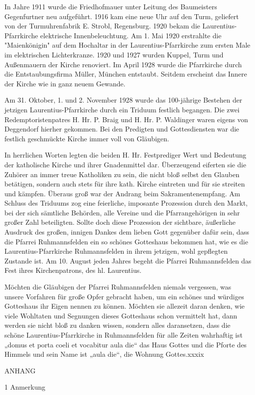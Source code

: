 \documentclass{book}
\begin{document}
In Jahre 1911 wurde die Friedhofmauer unter Leitung des Baumeisters Gegenfurtner
neu aufgeführt. 1916 kam eine neue Uhr auf den Turm, geliefert von der
Turmuhrenfabrik E. Strobl, Regensburg. 1920 bekam die Laurentius-Pfarrkirche
elektrische Innenbeleuchtung. Am 1. Mai 1920 erstrahlte die "Maienkönigin" auf
dem Hochaltar in der Laurentius-Pfarrkirche zum ersten Male im elektrischen
Lichterkranze. 1920 und 1927 wurden Kuppel, Turm und Außenmauern der Kirche
renoviert. Im April 1928 wurde die Pfarrkirche durch die Entstaubungsfirma
Müller, München entstaubt. Seitdem erscheint das Innere der Kirche wie in ganz
neuem Gewande.

Am 31. Oktober, 1. und 2. November 1928 wurde das 100-jährige Bestehen der
jetzigen Laurentius-Pfarrkirche durch ein Triduum festlich begangen. Die zwei
Redemptoristenpatres H. Hr. P. Braig und H. Hr. P. Waldinger waren eigens von
Deggendorf hierher gekommen. Bei den Predigten und Gottesdiensten war die
festlich geschmückte Kirche immer voll von Gläubigen.

In herrlichen Worten legten die beiden H. Hr. Festprediger Wert und Bedeutung
der katholische Kirche und ihrer Gnadenmittel dar. Überzeugend eiferten sie die
Zuhörer an immer treue Katholiken zu sein, die nicht bloß selbst den Glauben
betätigen, sondern auch stets für ihre kath. Kirche eintreten und für sie
streiten und kämpfen. Überaus groß war der Andrang beim Sakramentenempfang. Am
Schluss des Triduums zog eine feierliche, imposante Prozession durch den Markt,
bei der sich sämtliche Behörden, alle Vereine und die Pfarrangehörigen in sehr
großer Zahl beteiligten. Sollte doch diese Prozession der sichtbare, äußerliche
Ausdruck des großen, innigen Dankes dem lieben Gott gegenüber dafür sein, dass
die Pfarrei Ruhmannsfelden ein so schönes Gotteshaus bekommen hat, wie es die
Laurentius-Pfarrkirche Ruhmannsfelden in ihrem jetzigen, wohl gepflegten
Zustande ist. Am 10. August jeden Jahres begeht die Pfarrei Ruhmannsfelden das
Fest ihres Kirchenpatrons, des hl. Laurentius.

Möchten die Gläubigen der Pfarrei Ruhmannsfelden niemals vergessen, was unsere
Vorfahren für große Opfer gebracht haben, um ein schönes und würdiges Gotteshaus
ihr Eigen nennen zu können. Möchten sie allezeit daran denken, wie viele
Wohltaten und Segnungen dieses Gotteshaus schon vermittelt hat, dann werden sie
nicht bloß zu danken wissen, sondern alles daransetzen, dass die schöne
Laurentius-Pfarrkirche in Ruhmannsfelden für alle Zeiten wahrhaftig ist „domus
et porta coeli et vocabitur aula die“ das Haus Gottes und die Pforte des Himmels
und sein Name ist „aula die“, die Wohnung Gottes.xxxix



ANHANG

1 Anmerkung
\end{document}
